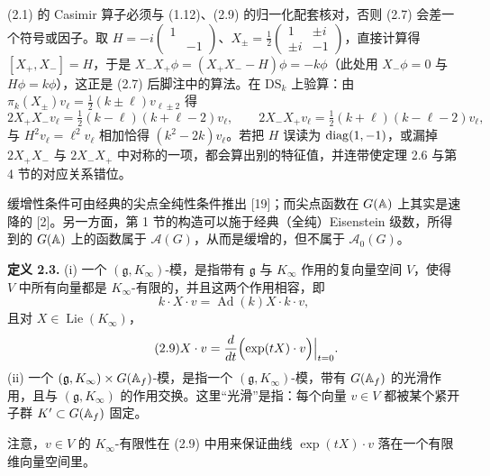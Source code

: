 \begin{annote}
(2.1) 的 Casimir 算子必须与 (1.12)、(2.9) 的归一化配套核对，否则 (2.7) 会差一个符号或因子。取 $H=-i\begin{pmatrix}1&\\&-1\end{pmatrix}$、$X_\pm=\frac12\begin{pmatrix}1&\pm i\\ \pm i&-1\end{pmatrix}$，直接计算得 $[X_+,X_-]=H$，于是 $X_-X_+\phi=(X_+X_--H)\phi=-k\phi$（此处用 $X_-\phi=0$ 与 $H\phi=k\phi$），这正是 (2.7) 后脚注中的算法。在 $\mathrm{DS}_k$ 上验算：由 $\pi_k(X_\pm)v_\ell=\frac12(k\pm\ell)v_{\ell\pm2}$ 得
\[
2X_+X_-v_\ell=\tfrac12(k-\ell)(k+\ell-2)v_\ell,\qquad
2X_-X_+v_\ell=\tfrac12(k+\ell)(k-\ell-2)v_\ell,
\]
与 $H^2v_\ell=\ell^2v_\ell$ 相加恰得 $(k^2-2k)v_\ell$。若把 $H$ 误读为 $\operatorname{diag}(1,-1)$，或漏掉 $2X_+X_-$ 与 $2X_-X_+$ 中对称的一项，都会算出别的特征值，并连带使定理 2.6 与第 4 节的对应关系错位。

\par\vspace{0.15em}{\raggedleft 【来源：原书第 139--140 页及其脚注；Bump 上书第 2 章（A）】\par}
\end{annote}

缓增性条件可由经典的尖点全纯性条件推出 [19]；而尖点函数在 $G(\mathbb{A})$ 上其实是速降的 [2]。另一方面，第 1 节的构造可以施于经典（全纯）Eisenstein 级数，所得到的 $G(\mathbb{A})$ 上的函数属于 $\mathcal{A}(G)$，从而是缓增的，但不属于 $\mathcal{A}_0(G)$。

\medskip\noindent\textbf{定义 2.3.}\quad
(i) 一个 $(\mathfrak{g},K_\infty)$-模，是指带有 $\mathfrak{g}$ 与 $K_\infty$ 作用的复向量空间 $V$，使得 $V$ 中所有向量都是 $K_\infty$-有限的，并且这两个作用相容，即
\begin{equation*}\tag{2.8}
k\cdot X\cdot v=\operatorname{Ad}(k)X\cdot k\cdot v,
\end{equation*}
且对 $X\in\operatorname{Lie}(K_\infty)$，
\begin{equation*}\tag{2.9}
X\cdot v=\frac{d}{dt}\Bigl(\exp(tX)\cdot v\Bigr)\Big|_{t=0}.
\end{equation*}
(ii) 一个 $(\mathfrak{g},K_\infty)\times G(\mathbb{A}_f)$-模，是指一个 $(\mathfrak{g},K_\infty)$-模，带有 $G(\mathbb{A}_f)$ 的光滑作用，且与 $(\mathfrak{g},K_\infty)$ 的作用交换。这里“光滑”是指：每个向量 $v\in V$ 都被某个紧开子群 $K'\subset G(\mathbb{A}_f)$ 固定。

\medskip
注意，$v\in V$ 的 $K_\infty$-有限性在 (2.9) 中用来保证曲线 $\exp(tX)\cdot v$ 落在一个有限维向量空间里。

